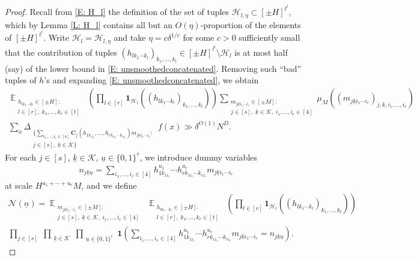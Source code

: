 \documentclass[11pt]{amsart}
\theoremstyle{definition}
\DeclareMathOperator*{\E}{\mathbb{E}}
\newcommand{\CH}{{\mathcal H}}
\newcommand{\CK}{{\mathcal K}}
\newcommand{\CN}{{\mathcal N}}
\newcommand{\bc}{{\mathbf{C}}}
\newcommand{\uk}{{\underline{k}}}
\newcommand{\un}{{\underline{n}}}
\newcommand{\uu}{{\underline{u}}}
\newcommand{\brac}[1]{\mathopen{}\left( #1 \mathclose{}\right)}
\begin{document}
\begin{proof}
Recall from \eqref{E: H_l} the definition of the set of tuples $\CH_{l,\eta}\subset[\pm H]^{t^l}$, which by Lemma \ref{L: H_l} contains all but an $O(\eta)$-proportion of the elements of $[\pm H]^{t^l}$. Write $\CH_l = \CH_{l, \eta}$ and take $\eta = c\delta^{1/c}$ for some $c>0$ sufficiently small that the contribution of tuples $(h_{l k_1\cdots k_l})_{k_1, \ldots, k_l} \in [\pm H]^{l^t} \setminus \CH_l$ is at most half (say) of the lower bound in \eqref{E: unsmoothedconcatenated}.  Removing such ``bad'' tuples of $h$'s and expanding \eqref{E: unsmoothedconcatenated}, we obtain
    \begin{multline}\label{E: expanded}
        \E_{\substack{h_{lk_1\cdots k_l}\in[\pm H]:\\ l\in[r],\; k_1, \ldots, k_r\in[t]}}\; \brac{ \prod_{l\in[r]}\mathbf{1}_{\CH_l}((h_{l k_1\cdots k_l})_{k_1, \ldots, k_l})}\sum_{\substack{m_{j\uk i_1\cdots i_r}\in[\pm M]:\\ j\in[s],\; \uk\in\CK,\; i_1, \ldots,  i_r\in[4]}} \mu_M((m_{j\uk i_1\cdots i_r})_{j, \uk, i_1, \ldots, i_r})\\
        \sum_x \Delta_{\substack{\{\sum\limits_{i_1, \ldots, i_r\in[4]}\bc_j(h_{1k_{1i_1}}, \ldots, h_{rk_{1i_1}\cdots k_{ri_r}})m_{j \uk i_1\cdots i_r}:\\ j\in[s],\; \uk\in\CK\}}}\; f(x) \gg \delta^{O(1)} N^D.
    \end{multline}
For each $j\in[s]$, $\uk\in\CK$, $\uu\in\{0,1\}^r$, we introduce dummy variables 
    \begin{align}\label{E: n_jku}
        n_{j\uk\uu} = \sum\limits_{i_1, \ldots, i_r\in[4]} h_{1k_{1i_1}}^{u_1} \cdots h_{rk_{1i_1}\cdots k_{ri_r}}^{u_r}m_{j\uk i_1\cdots i_r}
    \end{align}
    at scale $H^{u_1+\cdots + u_r}M$, and we define \begin{multline*}
        \CN(\un) = \E_{\substack{m_{j\uk i_1\cdots i_r}\in[\pm M]:\\ j\in[s],\; \uk\in\CK,\; i_1, \ldots,  i_r\in[4]}} \; 
        \E_{\substack{h_{lk_{1}\cdots k_{l}}\in[\pm H]:\\ l\in[r],\; k_1, \ldots, k_r\in[t] }}\; \brac{\prod_{l\in[r]}\mathbf{1}_{\CH_l}((h_{l k_1\cdots k_l})_{k_1, \ldots, k_l})} \\
        \prod_{j\in[s]}\; \prod_{\substack{\uk\in\CK}}\prod_{\substack{\uu\in\{0,1\}^r
        }} \mathbf{1}\brac{\sum\limits_{i_1, \ldots, i_r\in[4]} h_{1k_{1i_1}}^{u_1} \cdots h_{rk_{1i_1}\cdots k_{ri_r}}^{u_r}m_{j\uk i_1\cdots i_r} = n_{j\uk\uu}}.
    \end{multline*}

\end{proof}
\end{document}
